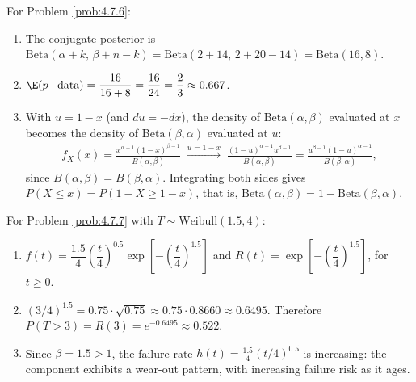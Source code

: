 \begin{solucion}
	\label{sol:4.7.6}
	For Problem \ref{prob:4.7.6}:
	\begin{enumerate}
		\item The conjugate posterior is $\text{Beta}(\alpha+k,\,\beta+n-k) = \text{Beta}(2+14,\,2+20-14) = \text{Beta}(16,8)$.
		\item $\E(p\mid\text{data}) = \dfrac{16}{16+8} = \dfrac{16}{24} = \dfrac{2}{3} \approx 0.667$.
		\item With $u=1-x$ (and $du=-dx$), the density of $\text{Beta}(\alpha,\beta)$ evaluated at $x$ becomes the density of $\text{Beta}(\beta,\alpha)$ evaluated at $u$:
		\begin{align*}
			f_X(x) = \frac{x^{\alpha-1}(1-x)^{\beta-1}}{B(\alpha,\beta)} \; \xrightarrow{u=1-x} \; \frac{(1-u)^{\alpha-1}u^{\beta-1}}{B(\alpha,\beta)} = \frac{u^{\beta-1}(1-u)^{\alpha-1}}{B(\beta,\alpha)},
		\end{align*}
		since $B(\alpha,\beta)=B(\beta,\alpha)$. Integrating both sides gives $P(X\le x) = P(1-X \ge 1-x)$, that is, $\text{Beta}(\alpha,\beta) = 1-\text{Beta}(\beta,\alpha)$. \quad \qedhere
	\end{enumerate}
\end{solucion}

\begin{solucion}
	\label{sol:4.7.7}
	For Problem \ref{prob:4.7.7} with $T \sim \text{Weibull}(1.5,4)$:
	\begin{enumerate}
		\item $f(t) = \dfrac{1.5}{4}\left(\dfrac{t}{4}\right)^{0.5}\exp\!\left[-\left(\dfrac{t}{4}\right)^{1.5}\right]$ and $R(t) = \exp\!\left[-\left(\dfrac{t}{4}\right)^{1.5}\right]$, for $t\ge 0$.
		\item $(3/4)^{1.5} = 0.75\cdot\sqrt{0.75} \approx 0.75\cdot 0.8660 \approx 0.6495$. Therefore $P(T>3) = R(3) = e^{-0.6495} \approx 0.522$.
		\item Since $\beta=1.5>1$, the failure rate $h(t) = \frac{1.5}{4}(t/4)^{0.5}$ is increasing: the component exhibits a wear-out pattern, with increasing failure risk as it ages. \quad \qedhere
	\end{enumerate}
\end{solucion}

